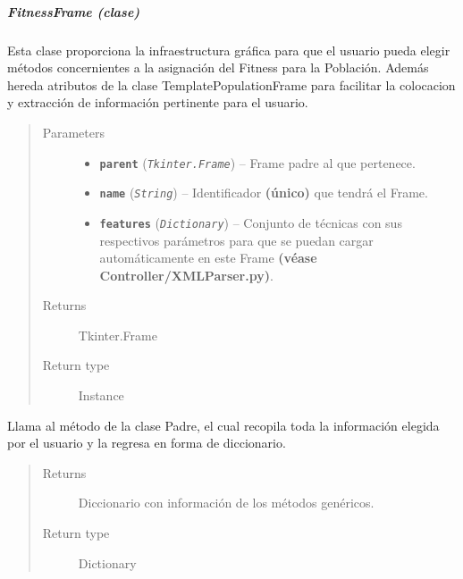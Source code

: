\documentclass[class=report, crop=false]{standalone}
\begin{document}
\subparagraph{FitnessFrame (clase)}
\label{sec:a_3_2_4_2_2}
\begin{fulllineitems}

\begin{DUlineblock}{0em}
\item[] Esta clase proporciona la infraestructura gráfica para que 
el usuario pueda elegir métodos concernientes a la asignación del 
Fitness para la Población.\break
Además hereda atributos de la clase TemplatePopulationFrame para 
facilitar la colocacion y extracción de información pertinente 
para el usuario.
\end{DUlineblock}

\begin{quote}\begin{description}
\item[{Parameters}] \leavevmode\begin{itemize}
\item \textbf{\texttt{parent}} (\emph{\texttt{Tkinter.Frame}}) -- Frame padre al que pertenece.
\item \textbf{\texttt{name}} (\emph{\texttt{String}}) -- Identificador \textbf{(único)} que tendrá el Frame.
\item \textbf{\texttt{features}} (\emph{\texttt{Dictionary}}) -- Conjunto de técnicas con sus respectivos parámetros para que se puedan cargar automáticamente en este Frame \textbf{(véase Controller/XMLParser.py)}.
\end{itemize}

\item[{Returns}] \leavevmode
Tkinter.Frame
\item[{Return type}] \leavevmode
Instance

\end{description}\end{quote}


\begin{fulllineitems}

Llama al método de la clase Padre, el cual recopila toda la 
información elegida por el usuario y la regresa en forma de 
diccionario.

\begin{quote}\begin{description}
\item[{Returns}] \leavevmode
Diccionario con información de los métodos genéricos.
\item[{Return type}] \leavevmode
Dictionary
\end{description}\end{quote}


\end{fulllineitems}
\end{fulllineitems}
\end{document}
